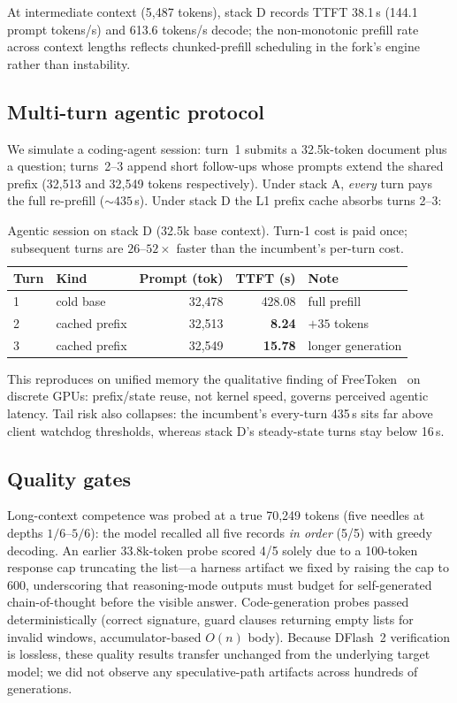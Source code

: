 \documentclass[11pt]{article}
\newcommand{\dflash}{DFlash~2}
\begin{document}
At intermediate context (5{,}487 tokens), stack D records TTFT 38.1\,s
(144.1 prompt tokens/s) and 613.6 tokens/s decode; the non-monotonic prefill
rate across context lengths reflects chunked-prefill scheduling in the fork's
engine rather than instability.

\subsection{Multi-turn agentic protocol}
\label{sec:agentic}
We simulate a coding-agent session: turn~1 submits a 32.5k-token document plus a
question; turns~2--3 append short follow-ups whose prompts extend the shared
prefix (32{,}513 and 32{,}549 tokens respectively). Under stack A, \emph{every}
turn pays the full re-prefill (${\sim}435$\,s). Under stack D the L1 prefix
cache absorbs turns 2--3:

\begin{table}[h]
\centering
\caption{Agentic session on stack D (32.5k base context). Turn-1 cost is paid
once; subsequent turns are $26$--$52\times$ faster than the incumbent's
per-turn cost.}
\label{tab:agentic}
\small
\begin{tabular}{llrrl}
\toprule
Turn & Kind & Prompt (tok) & TTFT (s) & Note \\
\midrule
1 & cold base & 32{,}478 & 428.08 & full prefill \\
2 & cached prefix & 32{,}513 & \textbf{8.24} & $+35$ tokens \\
3 & cached prefix & 32{,}549 & \textbf{15.78} & longer generation \\
\bottomrule
\end{tabular}
\end{table}

This reproduces on unified memory the qualitative finding of
FreeToken~\cite{freetoken} on discrete GPUs: prefix/state reuse, not kernel
speed, governs perceived agentic latency. Tail risk also collapses: the
incumbent's every-turn 435\,s sits far above client watchdog thresholds,
whereas stack D's steady-state turns stay below 16\,s.

\subsection{Quality gates}
Long-context competence was probed at a true 70{,}249 tokens (five needles at
depths $1/6$--$5/6$): the model recalled all five records \emph{in order}
(5/5) with greedy decoding. An earlier 33.8k-token probe scored 4/5 solely due
to a 100-token response cap truncating the list---a harness artifact we fixed
by raising the cap to 600, underscoring that reasoning-mode outputs must budget
for self-generated chain-of-thought before the visible answer. Code-generation
probes passed deterministically (correct signature, guard clauses returning
empty lists for invalid windows, accumulator-based $O(n)$ body). Because
\dflash{} verification is lossless, these quality results transfer unchanged
from the underlying target model; we did not observe any speculative-path
artifacts across hundreds of generations.
\end{document}
